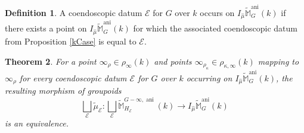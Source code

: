 \documentclass{article}
\DeclareMathOperator{\ani}{ani}
\newcommand{\BM}{{\mathbb{M}}}
\newcommand{\CE}{{\mathcal E}}
\theoremstyle{definition}
\newtheorem{definition}{Definition}[section]
\theoremstyle{plain}
\newtheorem{theorem}[definition]{Theorem}
\begin{document}
\begin{definition}
  A coendoscopic datum $\CE$ for $G$ over $k$ occurs on $I_{\hat\mu} \widetilde\BM^{\ani}_G(k)$ if there exists a point on $I_{\hat\mu} \widetilde\BM^{\ani}_G(k)$ for which the associated coendoscopic datum from Proposition \ref{kCase} is equal to $\CE$.
\end{definition}


\begin{theorem} \label{IMTheorem}
  For a point $\infty_\rho \in \rho_\infty(k)$ and points $\infty_{\rho_\kappa} \in \rho_{\kappa,\infty}(k)$ mapping to $\infty_\rho$ for every coendoscopic datum $\CE$ for $G$ over $k$ occurring on $I_{\hat\mu}\widetilde\BM^{\ani}_G(k)$, the resulting morphism of groupoids
\begin{equation*}
  \bigsqcup_{\CE}\tilde \mu_\CE \colon  \bigsqcup_{\CE} \widetilde{\BM}^{G-\infty,\ani}_{H_\CE}(k) \to I_{\hat\mu}\widetilde{\BM}^{\ani}_G(k)
\end{equation*}
is an equivalence.
\end{theorem}
\end{document}
